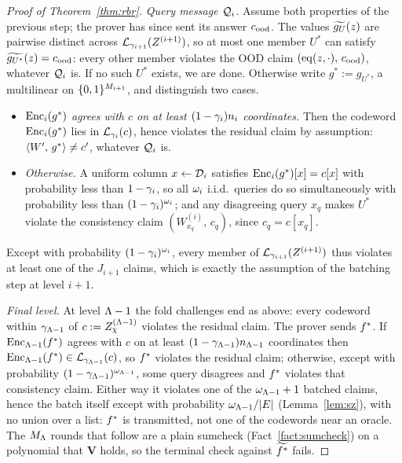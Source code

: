 \begin{proof}[Proof of Theorem~\ref{thm:rbr}]
\medskip\noindent\emph{Query message $\mathcal{Q}_i$.}
Assume both properties of the previous step; the prover has since sent its answer $c_{\mathrm{ood}}$. The values $\widetilde{g_U}(z)$ are pairwise distinct across $\mathcal{L}_{\gamma_{i+1}}(Z^{(i+1)})$, so at most one member $U^\ast$ can satisfy $\widetilde{g_{U^\ast}}(z) = c_{\mathrm{ood}}$: every other member violates the OOD claim $(\operatorname{eq}(z, \cdot),\, c_{\mathrm{ood}})$, whatever $\mathcal{Q}_i$ is. If no such $U^\ast$ exists, we are done. Otherwise write $g^\ast := g_{U^\ast}$, a multilinear on $\{0,1\}^{M_{i+1}}$, and distinguish two cases.
\begin{itemize}[itemsep=1pt]
\item \emph{$\mathrm{Enc}_i(g^\ast)$ agrees with $c$ on at least $(1 - \gamma_i) n_i$ coordinates.} Then the codeword $\mathrm{Enc}_i(g^\ast)$ lies in $\mathcal{L}_{\gamma_i}(c)$, hence violates the residual claim by assumption: $\langle W',\, g^\ast \rangle \neq c'$, whatever $\mathcal{Q}_i$ is.
\item \emph{Otherwise.} A uniform column $x \leftarrow \mathcal{D}_i$ satisfies $\mathrm{Enc}_i(g^\ast)[x] = c[x]$ with probability less than $1 - \gamma_i$, so all $\omega_i$ i.i.d.\ queries do so simultaneously with probability less than $(1 - \gamma_i)^{\omega_i}$; and any disagreeing query $x_q$ makes $U^\ast$ violate the consistency claim $(W^{(i)}_{x_q},\, c_q)$, since $c_q = c[x_q]$.
\end{itemize}
Except with probability $(1 - \gamma_i)^{\omega_i}$, every member of $\mathcal{L}_{\gamma_{i+1}}(Z^{(i+1)})$ thus violates at least one of the $J_{i+1}$ claims, which is exactly the assumption of the batching step at level $i + 1$.

\medskip\noindent\emph{Final level.}
At level $\Lambda - 1$ the fold challenges end as above: every codeword within $\gamma_{\Lambda-1}$ of $c := Z^{(\Lambda-1)}_\chi$ violates the residual claim. The prover sends $f^{\ast}$. If $\mathrm{Enc}_{\Lambda-1}(f^{\ast})$ agrees with $c$ on at least $(1 - \gamma_{\Lambda-1}) n_{\Lambda-1}$ coordinates then $\mathrm{Enc}_{\Lambda-1}(f^{\ast}) \in \mathcal{L}_{\gamma_{\Lambda-1}}(c)$, so $f^{\ast}$ violates the residual claim; otherwise, except with probability $(1 - \gamma_{\Lambda-1})^{\omega_{\Lambda-1}}$, some query disagrees and $f^{\ast}$ violates that consistency claim. Either way it violates one of the $\omega_{\Lambda-1}+1$ batched claims, hence the batch itself except with probability $\omega_{\Lambda-1}/|E|$ (Lemma~\ref{lem:sz}), with no union over a list: $f^{\ast}$ is transmitted, not one of the codewords near an oracle. The $M_\Lambda$ rounds that follow are a plain sumcheck (Fact~\ref{fact:sumcheck}) on a polynomial that $\mathbf{V}$ holds, so the terminal check against $\widetilde{f^{\ast}}$ fails.

\end{proof}


